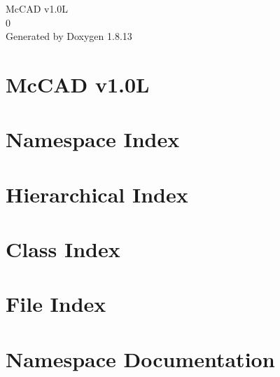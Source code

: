 \documentclass[twoside]{book}
\newcommand{\+}{\discretionary{\mbox{\scriptsize$\hookleftarrow$}}{}{}}
\newcommand{\clearemptydoublepage}{%
  \newpage{\pagestyle{empty}\cleardoublepage}%
}
\begin{document}
\hypersetup{pageanchor=false,
             bookmarksnumbered=true,
             pdfencoding=unicode
            }
\begin{titlepage}
\vspace*{7cm}
\begin{center}%
{\Large Mc\+C\+AD v1.0L \\[1ex]\large 0 }\\
\vspace*{1cm}
{\large Generated by Doxygen 1.8.13}\\
\end{center}
\end{titlepage}
\clearemptydoublepage
{}
\tableofcontents
\clearemptydoublepage
{}
\hypersetup{pageanchor=true}

\chapter{Mc\+C\+AD v1.0L}
\label{md__home_mharb_opt_McCAD_refactor_README}

\chapter{Namespace Index}

\chapter{Hierarchical Index}

\chapter{Class Index}

\chapter{File Index}

\chapter{Namespace Documentation}











\end{document}
